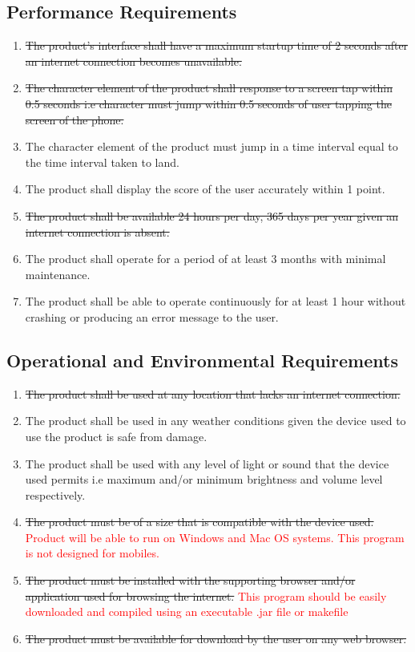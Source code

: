 \documentclass[12pt, titlepage]{article}
\begin{document}
\subsection{Performance Requirements}
\begin{enumerate}
\item  \sout{The product's interface shall have a maximum startup time of 2 seconds after an internet connection becomes unavailable.}
\item \sout{The character element of the product shall response to a screen tap within 0.5 seconds i.e character must jump within 0.5 seconds of user tapping the screen of the phone.}
\item The character element of the product must jump in a time interval equal to the time interval taken to land. 
\item The product shall display the score of the user accurately within 1 point.
\item \sout{The product shall be available 24 hours per day, 365 days per year given an internet connection is absent.}
\item The product shall operate for a period of at least 3 months with minimal maintenance. 
\item The product shall be able to operate continuously for at least 1 hour without crashing or producing an error message to the user.
\end{enumerate}

\subsection{Operational and Environmental Requirements}
\begin{enumerate}
\item \sout{The product shall be used at any location that lacks an internet connection.} 
\item The product shall be used in any weather conditions given the device used to use the product is safe from damage.
\item The product shall be used with any level of light or sound that the device used permits i.e maximum and/or minimum brightness and volume level respectively.
\item \sout{The product must be of a size that is compatible with the device used.} \textcolor{red}{Product will be able to run on Windows and Mac OS systems. This program is not designed for mobiles.}
\item \sout{The product must be installed with the supporting browser and/or application used for browsing the internet.} \textcolor{red}{This program should be easily downloaded and compiled using an executable .jar file or makefile} 
\item \sout{The product must be available for download by the user on any web browser.}
\end{enumerate}
\end{document}
